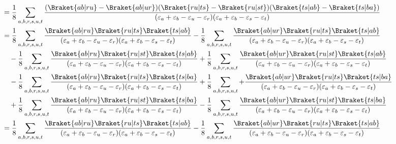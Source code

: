 \documentclass[a4paper]{article}
\begin{document}
\begin{align}
&=\dfrac{1}{8} \sum_{a,b,r,s,u,t} \dfrac{(\Braket{ab|ru}-\Braket{ab|ur}) (\Braket{ru|ts}-\Braket{ru|st}) (\Braket{ts|ab}-\Braket{ts|ba})}{(\varepsilon_a + \varepsilon_b - \varepsilon_u - \varepsilon_r)(\varepsilon_a + \varepsilon_b - \varepsilon_s - \varepsilon_t)}  \notag\\
&= \dfrac{1}{8} \sum_{a,b,r,s,u,t} \dfrac{\Braket{ab|ru} \Braket{ru|ts} \Braket{ts|ab}}{(\varepsilon_a + \varepsilon_b - \varepsilon_u - \varepsilon_r)(\varepsilon_a + \varepsilon_b - \varepsilon_s - \varepsilon_t)} 
- \dfrac{1}{8} \sum_{a,b,r,s,u,t} \dfrac{\Braket{ab|ur} \Braket{ru|ts} \Braket{ts|ab}}{(\varepsilon_a + \varepsilon_b - \varepsilon_u - \varepsilon_r)(\varepsilon_a + \varepsilon_b - \varepsilon_s - \varepsilon_t)} \notag\\
&\quad{} - \dfrac{1}{8} \sum_{a,b,r,s,u,t} \dfrac{\Braket{ab|ru} \Braket{ru|st} \Braket{ts|ab}}{(\varepsilon_a + \varepsilon_b - \varepsilon_u - \varepsilon_r)(\varepsilon_a + \varepsilon_b - \varepsilon_s - \varepsilon_t)} 
+ \dfrac{1}{8} \sum_{a,b,r,s,u,t} \dfrac{\Braket{ab|ur} \Braket{ru|st} \Braket{ts|ab}}{(\varepsilon_a + \varepsilon_b - \varepsilon_u - \varepsilon_r)(\varepsilon_a + \varepsilon_b - \varepsilon_s - \varepsilon_t)} 
\notag\\
&\quad{} - \dfrac{1}{8} \sum_{a,b,r,s,u,t} \dfrac{\Braket{ab|ru} \Braket{ru|ts} \Braket{ts|ba}}{(\varepsilon_a + \varepsilon_b - \varepsilon_u - \varepsilon_r)(\varepsilon_a + \varepsilon_b - \varepsilon_s - \varepsilon_t)} 
+ \dfrac{1}{8} \sum_{a,b,r,s,u,t} + \dfrac{\Braket{ab|ur} \Braket{ru|ts} \Braket{ts|ba}}{(\varepsilon_a + \varepsilon_b - \varepsilon_u - \varepsilon_r)(\varepsilon_a + \varepsilon_b - \varepsilon_s - \varepsilon_t)} \notag\\
&\quad{} + \dfrac{1}{8} \sum_{a,b,r,s,u,t} \dfrac{\Braket{ab|ru} \Braket{ru|st} \Braket{ts|ba}}{(\varepsilon_a + \varepsilon_b - \varepsilon_u - \varepsilon_r)(\varepsilon_a + \varepsilon_b - \varepsilon_s - \varepsilon_t)} 
- \dfrac{1}{8} \sum_{a,b,r,s,u,t} \dfrac{\Braket{ab|ur} \Braket{ru|st} \Braket{ts|ba}}{(\varepsilon_a + \varepsilon_b - \varepsilon_u - \varepsilon_r)(\varepsilon_a + \varepsilon_b - \varepsilon_s - \varepsilon_t)}  \notag\\
&= \dfrac{1}{8} \sum_{a,b,r,s,u,t} \dfrac{\Braket{ab|ru} \Braket{ru|ts} \Braket{ts|ab}}{(\varepsilon_a + \varepsilon_b - \varepsilon_u - \varepsilon_r)(\varepsilon_a + \varepsilon_b - \varepsilon_s - \varepsilon_t)} 
- \dfrac{1}{8} \sum_{a,b,r,s,u,t} \dfrac{\Braket{ab|ur} \Braket{ru|ts} \Braket{ts|ab}}{(\varepsilon_a + \varepsilon_b - \varepsilon_u - \varepsilon_r)(\varepsilon_a + \varepsilon_b - \varepsilon_s - \varepsilon_t)} \notag\\

\end{align}
\end{document}
